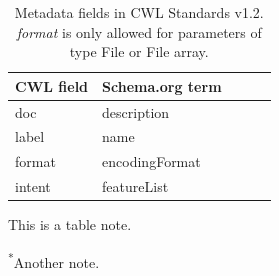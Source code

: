 \begin{table}[bt!]
\caption{Metadata fields in CWL Standards v1.2. \emph{format} is only allowed for parameters of type File or File array.}\label{tab:renske:metadata_fields}
\begin{tabularx}{\linewidth}{L l l l l}
\toprule
CWL field & Schema.org term \\
\midrule
doc & description \\ %
label & name \\ %
format & encodingFormat \\
intent & featureList \\

\bottomrule
\end{tabularx}
\begin{tablenotes}
\item This is a table note.
\item \textsuperscript{*}Another note.
\end{tablenotes}
\end{table}
